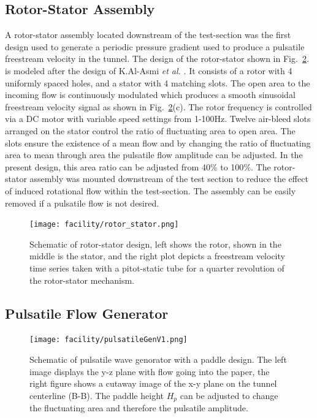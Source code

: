 \subsection{Rotor-Stator Assembly}
A rotor-stator assembly located downstream of the test-section was the first design used to generate a periodic pressure gradient used to produce a pulsatile freestream velocity in the tunnel. 
The design of the rotor-stator shown in Fig.~\ref{fig:rotor_stator}. is modeled after the design of K.Al-Asmi \textit{et al.} \cite{K.Al-Asmi1993}.
It consists of a rotor with 4 uniformly spaced holes, and a stator with 4 matching slots. 
The open area to the incoming flow is continuously modulated which produces a smooth sinusoidal freestream velocity signal as shown in Fig.~\ref{fig:rotor_stator}(c). 
The rotor frequency is controlled via a DC motor with variable speed settings from 1-100Hz. 
Twelve air-bleed slots arranged on the stator control the ratio of fluctuating area to open area. 
The slots ensure the existence of a mean flow and by changing the ratio of fluctuating area to mean through area the pulsatile flow amplitude can be adjusted. 
In the present design, this area ratio can be adjusted from 40$\%$ to 100$\%$. 
The rotor-stator assembly was mounted downstream of the test section to reduce the effect of induced rotational flow within the test-section. 
The assembly can be easily removed if a pulsatile flow is not desired.
 
\begin{figure}[t!]
\centering
\texttt{[image: facility/rotor\_stator.png]}
\caption{ \footnotesize Schematic of rotor-stator design, left shows the rotor, shown in the middle is the stator, and the right plot depicts a freestream velocity time series taken with a pitot-static tube for a quarter revolution of the rotor-stator mechanism.}
\label{fig:rotor_stator}
\end{figure}

\subsection{Pulsatile Flow Generator}

\begin{figure}[h!]
\centering
\texttt{[image: facility/pulsatileGenV1.png]}
\caption{ \footnotesize Schematic of pulsatile wave genorator with a paddle design. The left image displays the y-z plane with flow going into the paper, the right figure shows a cutaway image of the x-y plane on the tunnel centerline (B-B). The paddle height $H_p$ can be adjusted to change the fluctuating area and therefore the pulsatile amplitude.}
\label{fig:rotor_stator}
\end{figure}

